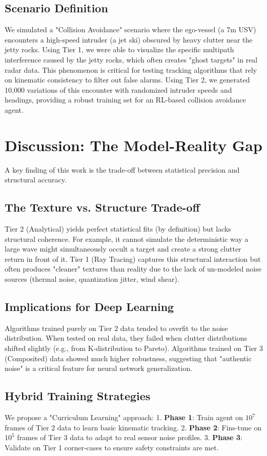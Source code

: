 \documentclass[conf]{new-aiaa}
\begin{document}
\subsection{Scenario Definition}
We simulated a "Collision Avoidance" scenario where the ego-vessel (a 7m USV) encounters a high-speed intruder (a jet ski) obscured by heavy clutter near the jetty rocks.
Using Tier 1, we were able to visualize the specific multipath interference caused by the jetty rocks, which often creates "ghost targets" in real radar data. This phenomenon is critical for testing tracking algorithms that rely on kinematic consistency to filter out false alarms.
Using Tier 2, we generated 10,000 variations of this encounter with randomized intruder speeds and headings, providing a robust training set for an RL-based collision avoidance agent.

\section{Discussion: The Model-Reality Gap}
A key finding of this work is the trade-off between statistical precision and structural accuracy.
\subsection{The Texture vs. Structure Trade-off}
Tier 2 (Analytical) yields perfect statistical fits (by definition) but lacks structural coherence. For example, it cannot simulate the deterministic way a large wave might simultaneously occult a target and create a strong clutter return in front of it. Tier 1 (Ray Tracing) captures this structural interaction but often produces "cleaner" textures than reality due to the lack of un-modeled noise sources (thermal noise, quantization jitter, wind shear).
\subsection{Implications for Deep Learning}
Algorithms trained purely on Tier 2 data tended to overfit to the noise distribution. When tested on real data, they failed when clutter distributions shifted slightly (e.g., from K-distribution to Pareto). Algorithms trained on Tier 3 (Composited) data showed much higher robustness, suggesting that "authentic noise" is a critical feature for neural network generalization.
\subsection{Hybrid Training Strategies}
We propose a "Curriculum Learning" approach:
1. \textbf{Phase 1}: Train agent on $10^7$ frames of Tier 2 data to learn basic kinematic tracking.
2. \textbf{Phase 2}: Fins-tune on $10^5$ frames of Tier 3 data to adapt to real sensor noise profiles.
3. \textbf{Phase 3}: Validate on Tier 1 corner-cases to ensure safety constraints are met.
\end{document}
